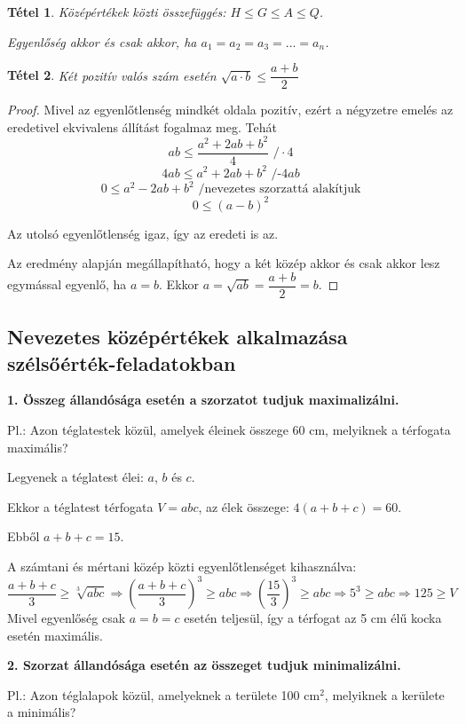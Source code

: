 \documentclass[12pt,a4paper]{article}
\newtheorem{theorem}{Tétel} [section]
\begin{document}
\begin{theorem}
Középértékek közti összefüggés: $H\leq G\leq A \leq Q$.
 
Egyenlőség akkor és csak akkor, ha $a_1=a_2=a_3=...=a_n$.
\end{theorem}

\begin{theorem}
Két pozitív valós szám esetén $\sqrt{a\cdot b}\leq \dfrac{a+b}{2}$
\end{theorem}
\begin{proof}
Mivel az egyenlőtlenség mindkét oldala pozitív, ezért a négyzetre emelés az eredetivel ekvivalens állítást fogalmaz meg. Tehát
$$ab\leq \dfrac{a^2+2ab+b^2}{4}\text{  /}\cdot \text{4}$$
$$4ab\leq a^2+2ab+b^2\text{  /-4}ab$$
$$0\leq a^2-2ab+b^2 \text{ /nevezetes szorzattá alakítjuk}$$
$$0\leq (a-b)^2$$

Az utolsó egyenlőtlenség igaz, így az eredeti is az.

Az eredmény alapján megállapítható, hogy a két közép akkor és csak akkor lesz egymással egyenlő, ha $a = b$. Ekkor $a=\sqrt{ab}=\dfrac{a+b}{2}=b$.
\end{proof}

\subsection{Nevezetes középértékek alkalmazása szélsőérték-feladatokban}
\textbf{1. Összeg állandósága esetén a szorzatot tudjuk maximalizálni.}

Pl.: Azon téglatestek közül, amelyek éleinek összege 60 cm, melyiknek a térfogata maximális?

Legyenek a téglatest élei: $a$, $b$ és $c$.

Ekkor a téglatest térfogata $V = abc$, az élek összege: $4(a + b + c) = 60$.

Ebből $a + b + c = 15$.

A számtani és mértani közép közti egyenlőtlenséget kihasználva:
$$\dfrac{a+b+c}{3}\geq \sqrt[3]{abc}\Rightarrow \left(\dfrac{a+b+c}{3} \right)^3\geq abc\Rightarrow \left(\dfrac{15}{3} \right)^3\geq abc \Rightarrow 5^3\geq abc \Rightarrow 125\geq V$$
Mivel egyenlőség csak $a = b = c$ esetén teljesül, így a térfogat az 5 cm élű kocka esetén maximális.

\vspace{20px}
\textbf{2. Szorzat állandósága esetén az összeget tudjuk minimalizálni.}

Pl.: Azon téglalapok közül, amelyeknek a területe 100 cm$^2$, melyiknek a kerülete a minimális?
\end{document}
